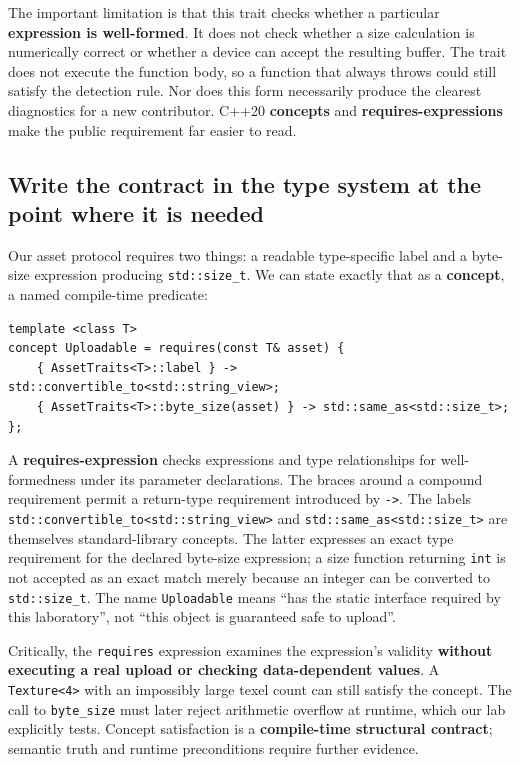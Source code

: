 The important limitation is that this trait checks whether a particular \textbf{expression is well-formed}. It does not check whether a size calculation is numerically correct or whether a device can accept the resulting buffer. The trait does not execute the function body, so a function that always throws could still satisfy the detection rule. Nor does this form necessarily produce the clearest diagnostics for a new contributor. C++20 \textbf{concepts} and \textbf{requires-expressions} make the public requirement far easier to read.

\subsection{Write the contract in the type system at the point where it is needed}\label{05-engine-i-ch005-write-the-contract-in-the-type-system-at-the-point-where-it-is-needed}

Our asset protocol requires two things: a readable type-specific label and a byte-size expression producing \texttt{std::size\_t}. We can state exactly that as a \textbf{concept}, a named compile-time predicate:

\begin{verbatim}
template <class T>
concept Uploadable = requires(const T& asset) {
    { AssetTraits<T>::label } -> std::convertible_to<std::string_view>;
    { AssetTraits<T>::byte_size(asset) } -> std::same_as<std::size_t>;
};
\end{verbatim}

A \textbf{requires-expression} checks expressions and type relationships for well-formedness under its parameter declarations. The braces around a compound requirement permit a return-type requirement introduced by \texttt{-\textgreater{}}. The labels \texttt{std::convertible\_to\textless{}std::string\_view\textgreater{}} and \texttt{std::same\_as\textless{}std::size\_t\textgreater{}} are themselves standard-library concepts. The latter expresses an exact type requirement for the declared byte-size expression; a size function returning \texttt{int} is not accepted as an exact match merely because an integer can be converted to \texttt{std::size\_t}. The name \texttt{Uploadable} means ``has the static interface required by this laboratory'', not ``this object is guaranteed safe to upload''.

Critically, the \texttt{requires} expression examines the expression's validity \textbf{without executing a real upload or checking data-dependent values}. A \texttt{Texture\textless{}4\textgreater{}} with an impossibly large texel count can still satisfy the concept. The call to \texttt{byte\_size} must later reject arithmetic overflow at runtime, which our lab explicitly tests. Concept satisfaction is a \textbf{compile-time structural contract}; semantic truth and runtime preconditions require further evidence.

